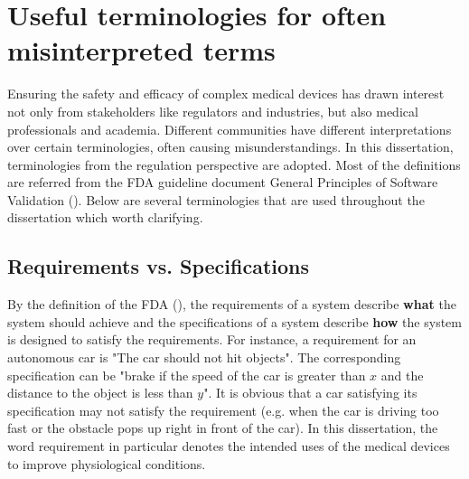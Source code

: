 \section{Useful terminologies for often misinterpreted terms}
Ensuring the safety and efficacy of complex medical devices has drawn interest not only from stakeholders like regulators and industries, but also medical professionals and academia. 
Different communities have different interpretations over certain terminologies, often causing misunderstandings. 
In this dissertation, terminologies from the regulation perspective are adopted. 
Most of the definitions are referred from the FDA guideline document General Principles of Software Validation (\cite{fda2}). 
Below are several terminologies that are used throughout the dissertation which worth clarifying.
\subsection{Requirements vs. Specifications}
By the definition of the FDA (\cite{fda3}), the requirements of a system describe \textbf{what} the system should achieve and the specifications of a system describe \textbf{how} the system is designed to satisfy the requirements. 
For instance, a requirement for an autonomous car is "The car should not hit objects". 
The corresponding specification can be "brake if the speed of the car is greater than $x$ and the distance to the object is less than $y$". 
It is obvious that a car satisfying its specification may not satisfy the requirement (e.g. when the car is driving too fast or the obstacle pops up right in front of the car). 
In this dissertation, the word requirement in particular denotes the intended uses of the medical devices to improve physiological conditions.


